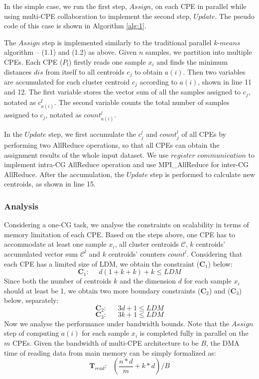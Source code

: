 \documentclass[10pt,journal,compsoc]{IEEEtran}
\begin{document}
In the simple case, we run the first step, $Assign$, on each CPE in parallel while using multi-CPE collaboration to implement the second step, $Update$. The pseudo code of this case is shown in Algorithm \ref{alg:1}.

The $Assign$ step is implemented similarly to the traditional parallel $k$-$means$ algorithm -- (1.1) and (1.2) as above. Given $n$ samples, we partition into multiple CPEs. Each CPE ($P_l$) firstly reads one sample $x_i$ and finds the minimum distances $dis$ from itself to all centroids $c_j$ to obtain $a(i)$.   
Then two variables are accumulated for each cluster centroid $c_j$ according to $a(i)$, shown in line 11 and 12. The first variable stores the vector sum of all the samples assigned to $c_j$, notated as $c_{a(i)}^l$. The second variable counts the total number of samples assigned to $c_j$, notated as $count_{a(i)}^l$. 

In the $Update$ step, we first accumulate the $c_{j}^l$ and $count_{j}^l$ of all CPEs by performing two AllReduce operations, so that all CPEs can obtain the assignment results of the whole input dataset.  We use $register$ $communication$ \cite{fang2017swdnn} to implement intra-CG AllReduce operation and use MPI\_AllReduce for inter-CG AllReduce. After the accumulation, the $Update$ step is performed to calculate new centroids, as shown in line 15.

\subsubsection*{Analysis} 
Considering a one-CG task, we analyse the constraints on scalability in terms of memory limitation of each CPE. Based on the steps above, one CPE has to accommodate at least one sample $x_i$, all cluster centroids $\mathcal{C}$, $k$ centroids' accumulated vector sum $\mathcal{C}^{l}$ and $k$ centroids' counters $count^l$. Considering that each CPE has a limited size of LDM, we obtain the constraint ($\mathbf{C}_1$) below: 
$$\mathbf{C}_1:\ \ \ \ \ \ d(1+k+k)+k \leq LDM  $$
Since both the number of centroids $k$ and the dimension $d$ for each sample $x_i$ should at least be 1, we obtain two more boundary constraints ($\mathbf{C}_2$) and ($\mathbf{C}_3$) below, separately: 
$$\mathbf{C}_2:\ \ \ \ \ \ \ 3d+1 \leq LDM  $$
$$\mathbf{C}_3:\ \ \ \ \ \ \ 3k+1 \leq LDM  $$
Now we analyse the performance under bandwidth bounds. Note that the $Assign$ step of computing $a(i)$ for each sample $x_i$ is completed fully in parallel on the $m$ CPEs. Given the bandwidth of multi-CPE architecture to be $B$, the DMA time of reading data from main memory can be simply formalized as: 
$$\mathbf{T}_{read}:\ \ \ (\frac{n*d}{m}+k*d)/B$$
\end{document}
